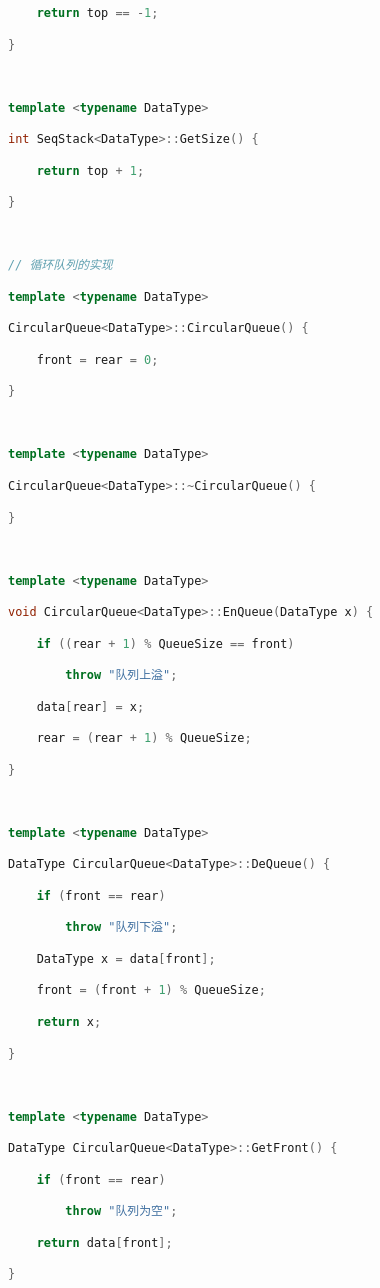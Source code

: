\begin{lstlisting}[language=C++]
    return top == -1;

}

  

template <typename DataType>

int SeqStack<DataType>::GetSize() {

    return top + 1;

}

  

// 循环队列的实现

template <typename DataType>

CircularQueue<DataType>::CircularQueue() {

    front = rear = 0;

}

  

template <typename DataType>

CircularQueue<DataType>::~CircularQueue() {

}

  

template <typename DataType>

void CircularQueue<DataType>::EnQueue(DataType x) {

    if ((rear + 1) % QueueSize == front)

        throw "队列上溢";

    data[rear] = x;

    rear = (rear + 1) % QueueSize;

}

  

template <typename DataType>

DataType CircularQueue<DataType>::DeQueue() {

    if (front == rear)

        throw "队列下溢";

    DataType x = data[front];

    front = (front + 1) % QueueSize;

    return x;

}

  

template <typename DataType>

DataType CircularQueue<DataType>::GetFront() {

    if (front == rear)

        throw "队列为空";

    return data[front];

}

  


\end{lstlisting}
